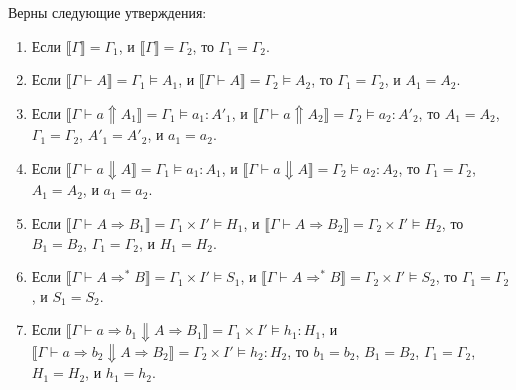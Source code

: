 \documentclass{amsart}
\theoremstyle{definition}
\theoremstyle{remark}
\newcommand{\red}{\Rightarrow}
\renewcommand{\ll}{\llbracket}
\newcommand{\rr}{\rrbracket}
\numberwithin{figure}{section}
\begin{document}
\begin{lem}
Верны следующие утверждения:
\begin{enumerate}
\item Если $\ll \Gamma \rr = \Gamma_1$, и $\ll \Gamma \rr = \Gamma_2$, то $\Gamma_1 = \Gamma_2$.
\item Если $\ll \Gamma \vdash A \rr = \Gamma_1 \models A_1$, и $\ll \Gamma \vdash A \rr = \Gamma_2 \models A_2$, то $\Gamma_1 = \Gamma_2$, и $A_1 = A_2$.
\item Если $\ll \Gamma \vdash a \Uparrow A_1 \rr = \Gamma_1 \models a_1 : A'_1$, и $\ll \Gamma \vdash a \Uparrow A_2 \rr = \Gamma_2 \models a_2 : A'_2$, то $A_1 = A_2$, $\Gamma_1 = \Gamma_2$, $A'_1 = A'_2$, и $a_1 = a_2$.
\item Если $\ll \Gamma \vdash a \Downarrow A \rr = \Gamma_1 \models a_1 : A_1$, и $\ll \Gamma \vdash a \Downarrow A \rr = \Gamma_2 \models a_2 : A_2$, то $\Gamma_1 = \Gamma_2$, $A_1 = A_2$, и $a_1 = a_2$.
\item Если $\ll \Gamma \vdash A \red B_1 \rr = \Gamma_1 \times I' \models H_1$, и $\ll \Gamma \vdash A \red B_2 \rr = \Gamma_2 \times I' \models H_2$, то $B_1 = B_2$, $\Gamma_1 = \Gamma_2$, и $H_1 = H_2$.
\item Если $\ll \Gamma \vdash A \red^* B \rr = \Gamma_1 \times I' \models S_1$, и $\ll \Gamma \vdash A \red^* B \rr = \Gamma_2 \times I' \models S_2$, то $\Gamma_1 = \Gamma_2$, и $S_1 = S_2$.
\item Если $\ll \Gamma \vdash a \red b_1 \Downarrow A \red B_1 \rr = \Gamma_1 \times I' \models h_1 : H_1$, и $\ll \Gamma \vdash a \red b_2 \Downarrow A \red B_2 \rr = \Gamma_2 \times I' \models h_2 : H_2$, то $b_1 = b_2$, $B_1 = B_2$, $\Gamma_1 = \Gamma_2$, $H_1 = H_2$, и $h_1 = h_2$.
\end{enumerate}
\end{lem}
\end{document}
